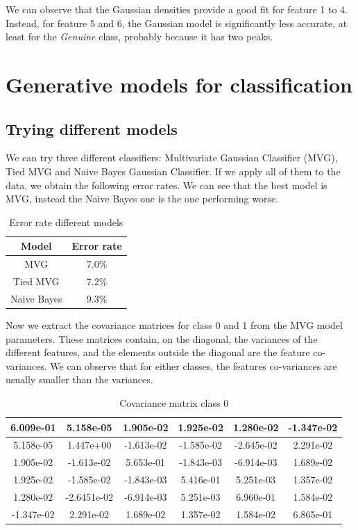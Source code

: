 \documentclass[12pt, a4paper]{article}
\begin{document}
We can observe that the Gaussian densities provide a good fit for feature 1 to 4. Instead, for feature 5 and 6, the Gaussian model is significantly less accurate, at least for the \textit{Genuine} class, probably because it has two peaks.

\clearpage
\section{Generative models for classification}
\subsection{Trying different models}

We can try three different classifiers: Multivariate Gaussian Classifier (MVG), Tied MVG and Naive Bayes Gaussian Classifier. If we apply all of them to the data, we obtain the following error rates. We can see that the best model is MVG, instead the Naive Bayes one is the one performing worse.
	
\begin{table}[ht!]
	\centering
 	\begin{tabular}{| | c c | |} 
 		\hline
 		Model & Error rate\\
 		\hline\hline
 		MVG & 7.0\%\\
 		\hline
 		Tied MVG & 7.2\%\\
 		\hline
 		Naive Bayes & 9.3\%\\
 		\hline
 	\end{tabular}
	\caption{Error rate different models}
\end{table}

Now we extract the covariance matrices for class 0 and 1 from the MVG model parameters. These matrices contain, on the diagonal, the variances of the different features, and the elements outside the diagonal are the feature co-variances. We can observe that for either classes, the features co-variances are usually smaller than the variances.

\begin{table}[ht!]
	\centering
    \begin{tabular}{| | c c c c c c | |} 
 		\hline
    	6.009e-01 & 5.158e-05 & 1.905e-02 & 1.925e-02 & 1.280e-02 & -1.347e-02\\
 		\hline
    	5.158e-05 & 1.447e+00 & -1.613e-02 & -1.585e-02 & -2.645e-02 & 2.291e-02\\
 		\hline
    	1.905e-02 & -1.613e-02 & 5.653e-01 & -1.843e-03 & -6.914e-03 & 1.689e-02\\
 		\hline
    	1.925e-02 & -1.585e-02 & -1.843e-03 & 5.416e-01 & 5.251e-03 & 1.357e-02\\
 		\hline
    	1.280e-02 & -2.6451e-02 & -6.914e-03 & 5.251e-03 & 6.960e-01 & 1.584e-02\\
 		\hline
    	-1.347e-02 & 2.291e-02 & 1.689e-02 & 1.357e-02 & 1.584e-02 & 6.865e-01\\
 		\hline
 	\end{tabular}
    \caption{Covariance matrix class 0}
\end{table}
\end{document}
